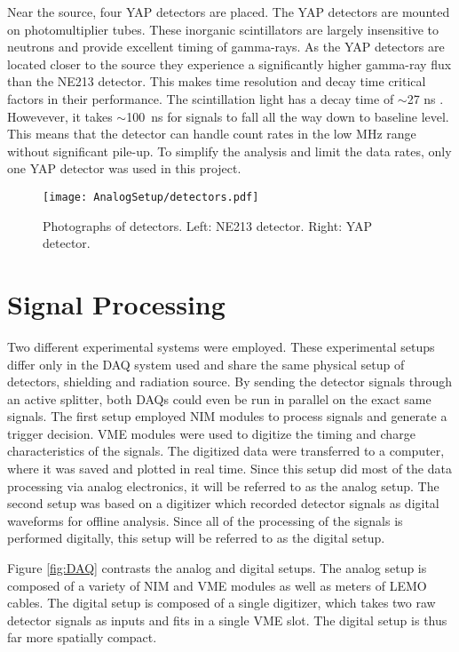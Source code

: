 \documentclass[main.tex]{subfiles}
\begin{document}
Near the source, four YAP detectors are placed. The YAP detectors are mounted on photomultiplier tubes. These inorganic scintillators are largely insensitive to neutrons and provide excellent timing of gamma-rays. As the YAP detectors are located closer to the source they experience a significantly higher gamma-ray flux than the NE213 detector. This makes time resolution and decay time critical factors in their performance. The scintillation light has a decay time of $\sim$27 ns \cite{Scionix}. Howevever, it takes $\sim$\SI{100}{ns} for signals to fall all the way down to baseline level. This means that the detector can handle count rates in the low MHz range without significant pile-up. To simplify the analysis and limit the data rates, only one YAP detector was used in this project.

\begin{figure}[h]
    \centering
        \texttt{[image: AnalogSetup/detectors.pdf]}
        \caption[Photographs of detectors]{Photographs of detectors. Left: NE213 detector. Right: YAP detector.}
    \label{fig:detectors}
\end{figure}


\section{Signal Processing}
Two different experimental systems were employed. These experimental setups differ only in the DAQ system used and share the same physical setup of detectors, shielding and radiation source. By sending the detector signals through an active splitter, both DAQs could even be run in parallel on the exact same signals. The first setup employed NIM modules to process signals and generate a trigger decision. VME modules were used to digitize the timing and charge characteristics of the signals. The digitized data were transferred to a computer, where it was saved and plotted in real time. Since this setup did most of the data processing via analog electronics, it will be referred to as the analog setup. The second setup was based on a digitizer which recorded detector signals as digital waveforms for offline analysis. Since all of the processing of the signals is performed digitally, this setup will be referred to as the digital setup. 

Figure \ref{fig:DAQ} contrasts the analog and digital setups. The analog setup is composed of a variety of NIM and VME modules as well as meters of LEMO cables. The digital setup is composed of a single digitizer, which takes two raw detector signals as inputs and fits in a single VME slot. The digital setup is thus far more spatially compact.
\end{document}
